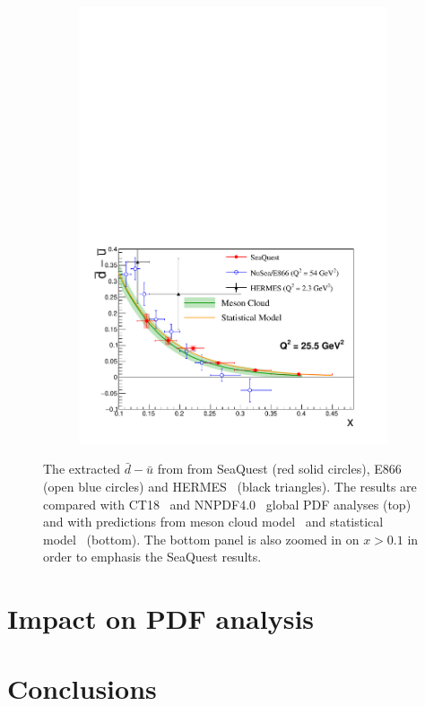\documentclass[reprint,aps,unsortedaddress,superscriptaddress,prl,floatfix,showpacs,linenumbers]{revtex4-2}
\begin{document}
\begin{figure}[htpb!]
\begin{subfigure}{\linewidth}
		\includegraphics[width=\linewidth]{dbub_diff_with_model.pdf}
	\end{subfigure}
	\caption{The extracted $\bar{d}-\bar{u}$ from from SeaQuest (red solid circles), E866~\cite{towell2001} (open blue circles)
		and HERMES~\cite{ackerstaff1998} (black triangles).
		The results are compared with CT18~\cite{hou2021} and NNPDF4.0~\cite{ball2022a} global PDF analyses (top)
		and with predictions from meson cloud model~\cite{alberg2022} and statistical model~\cite{soffer2019} (bottom).
		The bottom panel is also zoomed in on $x>0.1$ in order to emphasis the SeaQuest results.}
	\label{fig:e906_e866_dbarMubar}
\end{figure}


\section{Impact on PDF analysis}

\section{Conclusions}

\begin{acknowledgments}
\end{acknowledgments}

\end{document}
